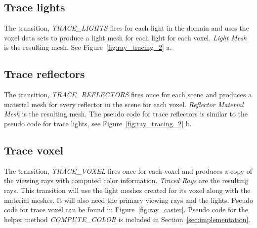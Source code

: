 \subsection{Trace lights}
The transition, \emph{TRACE\_LIGHTS} fires for each light in the domain and
uses the voxel data sets to produce a light mesh for each light for each
voxel.  \emph{Light Mesh} is the resulting mesh.  See 
Figure~\ref{fig:ray_tracing_2} a.

\subsection{Trace reflectors}
The transition, \emph{TRACE\_REFLECTORS} fires once for each scene and produces a
material mesh for every reflector in the scene for each voxel.  \emph{Reflector
Material Mesh} is the resulting mesh.  The pseudo code for trace reflectors is
similar to the pseudo code for trace lights, see Figure~\ref{fig:ray_tracing_2} 
b.

\subsection{Trace voxel}
The transition, \emph{TRACE\_VOXEL} fires once for each voxel and produces a 
copy of the viewing rays with computed color information.  \emph{Traced Rays} 
are the resulting rays.  This transition will use the light meshes created for 
its voxel along with the material meshes.  It will also need the primary viewing 
rays and the lights.  Pseudo code for trace voxel can be found in 
Figure~\ref{fig:ray_caster}.  Pseudo code for the helper method 
\emph{COMPUTE\_COLOR} is included in Section~\ref{sec:implementation}.


